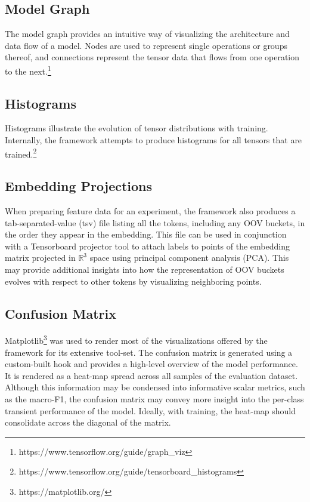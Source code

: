 \documentclass[../../fyp.tex]{subfiles}
\begin{document}
\subsection{Model Graph}
The model graph provides an intuitive way of visualizing the architecture and data flow of a model. Nodes are used to represent single operations or groups thereof, and connections represent the tensor data that flows from one operation to the next.\footnote{https://www.tensorflow.org/guide/graph\_viz} 

\subsection{Histograms}
Histograms illustrate the evolution of tensor distributions with training. Internally, the framework attempts to produce histograms for all tensors that are trained.\footnote{https://www.tensorflow.org/guide/tensorboard\_histograms}

\subsection{Embedding Projections}
When preparing feature data for an experiment, the framework also produces a tab-separated-value (tsv) file listing all the tokens, including any OOV buckets, in the order they appear in the embedding. This file can be used in conjunction with a Tensorboard projector tool to attach labels to points of the embedding matrix projected in $\mathbb{R}^3$ space using principal component analysis (PCA). This may provide additional insights into how the representation of OOV buckets evolves with respect to other tokens by visualizing neighboring points.

\subsection{Confusion Matrix}
Matplotlib\footnote{https://matplotlib.org/} was used to render most of the visualizations offered by the framework for its extensive tool-set. The confusion matrix is generated using a custom-built hook and provides a high-level overview of the model performance. It is rendered as a heat-map spread across all samples of the evaluation dataset. Although this information may be condensed into informative scalar metrics, such as the macro-F1, the confusion matrix may convey more insight into the per-class transient performance of the model. Ideally, with training, the heat-map should consolidate across the diagonal of the matrix.
\end{document}
